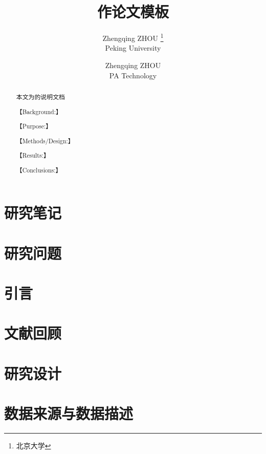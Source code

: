 \documentclass[lang=cn,18pt,a4paper]{elegantpaper}
\title{作论文模板}
\author{Zhengqing ZHOU \thanks{北京大学} \\ Peking University \and Zhengqing ZHOU \\ PA Technology}
\institute{\href{https://pe.pku.edu.cn/}{体育教研部}}
\date{\zhtoday}
\begin{document}
\begin{titlepage}
\clearpage\maketitle
\thispagestyle{empty}

\begin{abstract}
本文为的说明文档
 \par
【Background:】
\par
【Purpose:】
\par
【Methods/Design:】 
\par
【Results:】 
\par
【Conclusions:】

\end{abstract}

\end{titlepage}
    \thispagestyle{empty}
	\newpage
    \tableofcontents
    \setcounter{page}{1}
	\newpage

	\section*{研究笔记} \label{sec:text}
	
	\newpage
	\section{研究问题} \label{sec:research questions}
	
	\newpage
	\section{引言} \label{sec:introduction}
	
	\newpage
	\section{文献回顾} \label{sec:review}
	
	\newpage
	\section{研究设计} \label{sec:design}
	
    \newpage
    \section{数据来源与数据描述}\label{sec:data}
	
    \newpage
\end{document}

